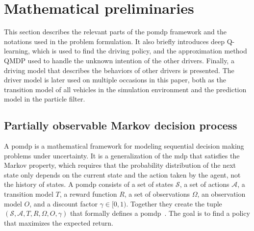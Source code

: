 \section{Mathematical preliminaries}
\label{sec:background}

This section describes the relevant parts of the \gls{pomdp} framework and the notations used in the problem formulation. It also briefly introduces deep Q-learning, which is used to find the driving policy, and the approximation method QMDP used to handle the unknown intention of the other drivers.
Finally, a driving model that describes the behaviors of other drivers is presented. The driver model is later used on multiple occasions in this paper, both as the transition model of all vehicles in the simulation environment and the prediction model in the particle filter. 

\subsection{Partially observable Markov decision process}
\label{sec:pomdp}
A \gls{pomdp} is a mathematical framework for modeling sequential decision making problems under uncertainty. It is a generalization of the \gls{mdp} that satisfies the Markov property, which requires that the probability distribution of the next state only depends on the current state and the action taken by the agent, not the history of states. 
A \gls{pomdp} consists of a set of states $\mathcal{S}$, a set of actions $\mathcal{A}$, a transition model $T$, a reward function $R$, a set of observations $\Omega$, an observation model $O$, and a discount factor $\gamma \in [0,1)$. Together they create the tuple $(\mathcal{S},\mathcal{A},T,R,\Omega,O,\gamma)$ that formally defines a \gls{pomdp}~\cite{Kochenderfer2015}. The goal is to find a policy that maximizes the expected return. 



